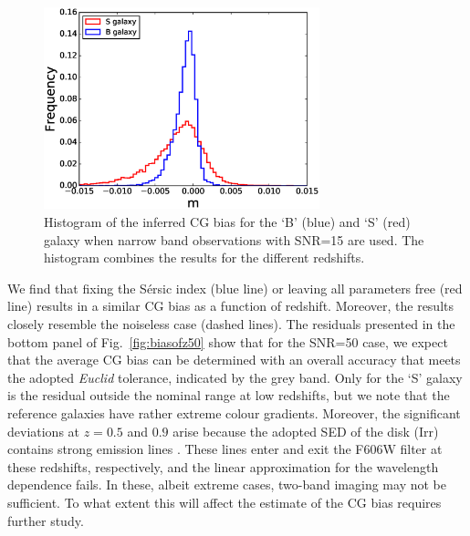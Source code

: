 \documentclass[useAMS,usenatbib]{mnras}
\begin{document}
\begin{figure}
  \includegraphics[width=8.0cm]{zs2n15his.eps}
  \caption{Histogram of the inferred CG bias for the `B' (blue) and
  `S' (red) galaxy when narrow band observations with SNR=15
  are used. The histogram combines the results for the different
  redshifts.}
  \label{fig:histogrambias}
\end{figure}

We find that fixing the S{\'e}rsic index (blue line) or leaving all parameters free (red line) results in a similar CG bias as a function of redshift. Moreover, the results closely resemble the noiseless case (dashed lines).  
The residuals presented in the bottom panel of Fig.~\ref{fig:biasofz50} show that  for the SNR=50 case, we expect that the average CG bias can be determined with an overall accuracy that meets the adopted {\it Euclid} tolerance, indicated by the grey band. Only for the `S' galaxy is the residual outside the nominal range at low redshifts, but we note that the reference galaxies have rather extreme colour gradients.
Moreover, the significant deviations at $z=0.5$ and $0.9$ arise because the adopted SED of the disk (Irr) contains strong emission lines  . These lines enter and exit the F606W filter at these redshifts, respectively, and the linear approximation for the wavelength
dependence fails. In these, albeit extreme cases, two-band imaging may not be sufficient. To what extent this will affect the estimate of the CG bias requires further study.
\end{document}
